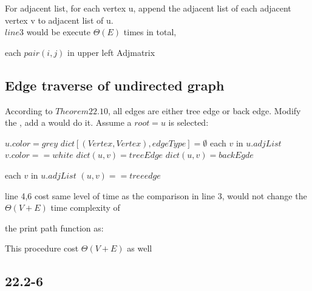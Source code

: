\documentclass[]{article}
\begin{document}
For adjacent list, for each vertex u, append the adjacent list of each adjacent vertex v to adjacent list of u.\\
$line 3$ would be execute $\Theta(E)$ times in total, 

\begin{codebox}
	\li \For each $pair(i,j)$ in upper left Adjmatrix
	\li		\Do {}
	\End
\end{codebox}

\subsection{Edge traverse of undirected graph}

According to $Theorem 22.10$, all edges are either tree edge or back edge. Modify the , add a  would do it. Assume a $root = u$ is selected:

\begin{codebox}
	
	\li $u.color = grey$
	\li $dict[(Vertex,Vertex), edgeType] = \emptyset$
	\li	\For each $v$ in $u.adjList$
	\li \Do \If $v.color == white$
	\li 	\Then $dict(u,v) = treeEdge$
	\li 		  {}
	\li 	\Else $dict(u,v) = backEgde$
	\End
	\End
	\li {}
	
\end{codebox}

\begin{codebox}
	
	\li {}
	\li	\For each $v$ in $u.adjList$
	\li \Do \If $(u,v) == treeedge$
	\li 	\Then {}
	\li     {}
	\li 	\Else {}
	\End
	\End
	
\end{codebox}

line 4,6 cost same level of time as the comparison in line 3, would not change the $\Theta(V+E)$ time complexity of 

the print path function as:

This procedure cost $\Theta(V+E)$ as well

\subsection{22.2-6}
\end{document}
